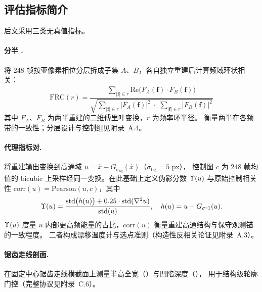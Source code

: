\subsection{评估指标简介}

后文采用三类无真值指标。

\paragraph{分半 .}
将 248 帧按亚像素相位分层拆成子集 \(A\)、\(B\)，各自独立重建后计算频域环状相关：
\begin{equation}
  \mathrm{FRC}(r) = \frac{\displaystyle\sum_{|\mathbf{f}| \in r} \mathrm{Re}\bigl(F_A(\mathbf{f}) \cdot \overline{F_B(\mathbf{f})}\bigr)}
  {\sqrt{\displaystyle\sum_{|\mathbf{f}| \in r} |F_A(\mathbf{f})|^2 \;\cdot\; \sum_{|\mathbf{f}| \in r} |F_B(\mathbf{f})|^2}}
\end{equation}
其中 \(F_A\)、\(F_B\) 为两半重建的二维傅里叶变换，\(r\) 为频率环半径。
 衡量两半在各频带的一致性；分层设计与控制组见附录~A.4。

\paragraph{代理指标对.}
将重建输出变换到高通域 \(u = \hat{x} - G_{\sigma_{\mathrm{bg}}}(\hat{x})\)（\(\sigma_{\mathrm{bg}} = 5\)  px），
控制图 \(c\) 为 248 帧均值的 bicubic 上采样经同一变换。在此基础上定义伪影分数 \(\Upsilon(u)\) 与原始控制相关性 \(\mathrm{corr}(u)=\mathrm{Pearson}(u,c)\)，其中
\begin{equation}
  \Upsilon(u) = \frac{\mathrm{std}\bigl(h(u)\bigr) + 0.25 \cdot \mathrm{std}(\nabla^2 u)}{\mathrm{std}(u)},\quad h(u)=u-G_{\sigma\!=\!1}(u).
\end{equation}
\(\Upsilon(u)\) 度量 \(u\) 内部更高频能量的占比，\(\mathrm{corr}(u)\) 衡量重建高通结构与保守观测锚的一致程度。
二者构成漂移温度计与选点准则（构造性反相关论证见附录~A.3）。

\paragraph{锯齿走线剖面.}
在固定中心锯齿走线横截面上测量半高全宽（）与凹陷深度（），
用于结构级轮廓门控（完整协议见附录~C.6）。
